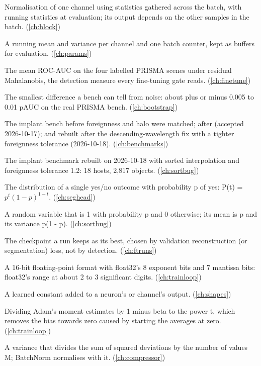 \begin{description}[style=nextline,leftmargin=1.2em,font=\normalfont\bfseries]
\item[BatchNorm] Normalisation of one channel using statistics gathered across the batch, with running statistics at evaluation; its output depends on the other samples in the batch. (\cref{ch:block})
\item[BatchNorm running statistics] A running mean and variance per channel and one batch counter, kept as buffers for evaluation. (\cref{ch:params})
\item[Bench] The mean ROC-AUC on the four labelled PRISMA scenes under residual Mahalanobis, the detection measure every fine-tuning gate reads. (\cref{ch:finetune})
\item[Bench resolution] The smallest difference a bench can tell from noise: about plus or minus 0.005 to 0.01 pAUC on the real PRISMA bench. (\cref{ch:bootstrap})
\item[bench-v1, bench-v2, bench-v2.1] The implant bench before foreignness and halo were matched; after (accepted 2026-10-17); and rebuilt after the descending-wavelength fix with a tighter foreignness tolerance (2026-10-18). (\cref{ch:benchmarks})
\item[bench-v2.1] The implant benchmark rebuilt on 2026-10-18 with sorted interpolation and foreignness tolerance 1.2: 18 hosts, 2,817 objects. (\cref{ch:sortbug})
\item[Bernoulli distribution] The distribution of a single yes/no outcome with probability p of yes: P(t) = $p^t(1-p)^{1-t}$. (\cref{ch:seghead})
\item[Bernoulli variable] A random variable that is 1 with probability p and 0 otherwise; its mean is p and its variance p(1 - p). (\cref{ch:sortbug})
\item[best.pt] The checkpoint a run keeps as its best, chosen by validation reconstruction (or segmentation) loss, not by detection. (\cref{ch:ftruns})
\item[bfloat16] A 16-bit floating-point format with float32's 8 exponent bits and 7 mantissa bits: float32's range at about 2 to 3 significant digits. (\cref{ch:trainloop})
\item[Bias] A learned constant added to a neuron's or channel's output. (\cref{ch:shapes})
\item[Bias correction] Dividing Adam's moment estimates by 1 minus beta to the power t, which removes the bias towards zero caused by starting the averages at zero. (\cref{ch:trainloop})
\item[Biased variance] A variance that divides the sum of squared deviations by the number of values M; BatchNorm normalises with it. (\cref{ch:compressor})

\end{description}
